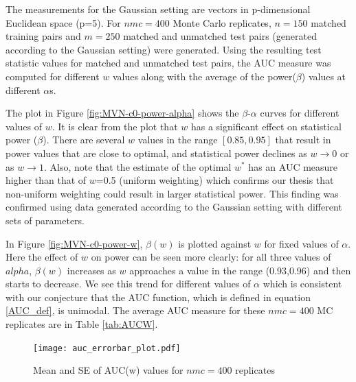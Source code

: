 \documentclass[12pt]{article} %
\begin{document}

	


 The measurements for the Gaussian setting are vectors in p-dimensional Euclidean space (p=5). For $nmc=400$ Monte Carlo replicates,  $n=150$ matched training pairs and $m=250$ matched and unmatched test pairs (generated according to the Gaussian setting) were generated. Using the resulting test statistic values for matched and unmatched test pairs, the AUC measure was computed for different $w$ values along with the average of the power($\beta$) values at  different $\alpha$s.

 The plot in Figure \ref{fig:MVN-c0-power-alpha} shows the  $\beta$-$\alpha$ curves for different values of  $w$. It is clear from the plot that $w$ has a significant effect on statistical power ($\beta$). There are several $w$ values in the range $[0.85,0.95]$ that result in power values that are close to optimal, and statistical power declines as $w \rightarrow 0$ or as $w \rightarrow 1$. 
Also, note that   the estimate of the optimal $w^{*}$  has  an AUC measure higher than  that of $w$=0.5 (uniform weighting) which confirms our thesis that non-uniform weighting could result in larger statistical power. This finding was confirmed using data generated 
according to  the Gaussian setting with different sets of parameters.

 In Figure
 \ref{fig:MVN-c0-power-w},  $\beta(w)$ is plotted against $w$ for fixed values of $\alpha$.  Here the effect of $w$ on power can be seen more clearly: for all  three values of $alpha$, $\beta(w)$ increases as $w$ approaches a value in the range (0.93,0.96) and then starts to decrease. We see this trend for different values of $\alpha$ which is consistent with our conjecture that the AUC function, which is defined in equation \eqref{AUC_def}, is unimodal.
The average AUC measure for these $nmc=400$ MC replicates are  in  Table \ref{tab:AUCW}.

\begin{figure}[h]
	\centering
	
		\texttt{[image: auc\_errorbar\_plot.pdf]}
	
	\caption{Mean and SE of AUC(w) values for $nmc=400$ replicates}
	\label{fig:AUCW}
\end{figure}
\end{document}
